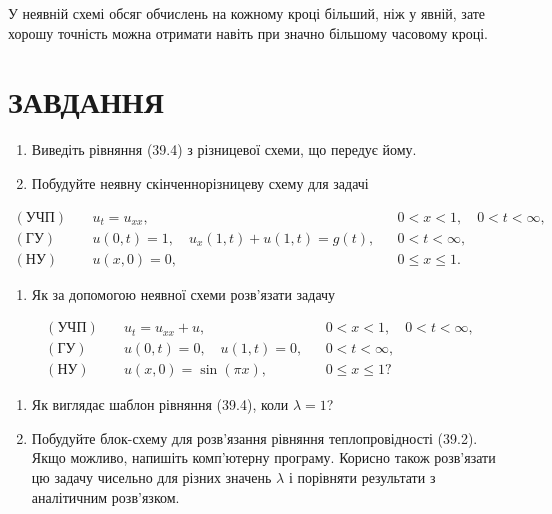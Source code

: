 \documentclass[
  ukrainian,
]{article}
\providecommand{\tightlist}{%
  \setlength{\itemsep}{0pt}\setlength{\parskip}{0pt}}
\begin{document}
У неявній схемі обсяг обчислень на кожному кроці більший, ніж у явній,
зате хорошу точність можна отримати навіть при значно більшому часовому
кроці.

\section{ЗАВДАННЯ}\label{ux437ux430ux432ux434ux430ux43dux43dux44f-2}

\begin{enumerate}
\def\labelenumi{\arabic{enumi}.}
\item
  Виведіть рівняння (39.4) з різницевої схеми, що передує йому.
\item
  Побудуйте неявну скінченнорізницеву схему для задачі
\end{enumerate}

\[
\begin{aligned}
(\text{УЧП})\quad & u_t=u_{xx}, && 0<x<1,\quad 0<t<\infty,\\
(\text{ГУ})\quad & u(0,t)=1,\quad u_x(1,t)+u(1,t)=g(t), && 0<t<\infty,\\
(\text{НУ})\quad & u(x,0)=0, && 0\le x\le 1.
\end{aligned}
\]

\begin{enumerate}
\def\labelenumi{\arabic{enumi}.}
\setcounter{enumi}{2}
\tightlist
\item
  Як за допомогою неявної схеми розв'язати задачу
\end{enumerate}

\[
\begin{aligned}
(\text{УЧП})\quad & u_t=u_{xx}+u, && 0<x<1,\quad 0<t<\infty,\\
(\text{ГУ})\quad & u(0,t)=0,\quad u(1,t)=0, && 0<t<\infty,\\
(\text{НУ})\quad & u(x,0)=\sin(\pi x), && 0\le x\le 1?
\end{aligned}
\]

\begin{enumerate}
\def\labelenumi{\arabic{enumi}.}
\setcounter{enumi}{3}
\item
  Як виглядає шаблон рівняння (39.4), коли \(\lambda=1\)?
\item
  Побудуйте блок-схему для розв'язання рівняння теплопровідності (39.2).
  Якщо можливо, напишіть комп'ютерну програму. Корисно також розв'язати
  цю задачу чисельно для різних значень \(\lambda\) і порівняти
  результати з аналітичним розв'язком.
\end{enumerate}
\end{document}
